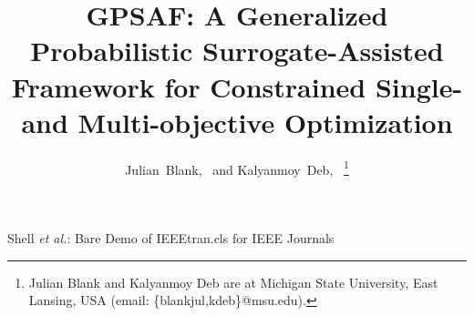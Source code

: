 \documentclass[journal]{IEEEtran}
\begin{document}
%
\title{GPSAF: A Generalized Probabilistic Surrogate-Assisted Framework for Constrained Single- and Multi-objective Optimization}


%


\author{Julian~Blank,~ and
        Kalyanmoy~Deb,~
\thanks{Julian Blank and Kalyanmoy Deb are at Michigan State University, East Lansing, USA (email: \{blankjul,kdeb\}@msu.edu).}
}




%
%



\markboth{}%
{Shell \MakeLowercase{\textit{et al.}}: Bare Demo of IEEEtran.cls for IEEE Journals}
%
\end{document}
